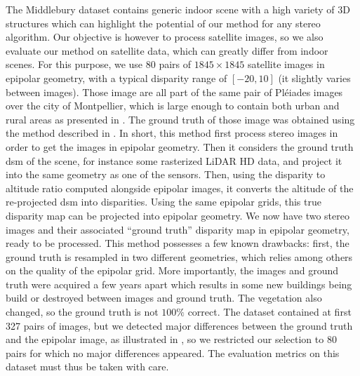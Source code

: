 The Middlebury dataset contains generic indoor scene with a high variety of 3D structures which can highlight the potential of our method for any stereo algorithm. Our objective is however to process satellite images, so we also evaluate our method on satellite data, which can greatly differ from indoor scenes. For this purpose, we use 80 pairs of $1845\times1845$ satellite images in epipolar geometry, with a typical disparity range of $[-20, 10]$ (it slightly varies between images). Those image are all part of the same pair of Pléiades images over the city of Montpellier, which is large enough to contain both urban and rural areas as presented in . The ground truth of those image was obtained using the method described in \cite{cournet_ground_2020}. In short, this method first process stereo images in order to get the images in epipolar geometry. Then it considers the ground truth \acrshort{dsm} of the scene, for instance some rasterized LiDAR HD data, and project it into the same geometry as one of the sensors. Then, using the disparity to altitude ratio computed alongside epipolar images, it converts the altitude of the re-projected \acrshort{dsm} into disparities. Using the same epipolar grids, this true disparity map can be projected into epipolar geometry. We now have two stereo images and their associated ``ground truth'' disparity map in epipolar geometry, ready to be processed. This method possesses a few known drawbacks: first, the ground truth is resampled in two different geometries, which relies among others on the quality of the epipolar grid. More importantly, the images and ground truth were acquired a few years apart which results in some new buildings being build or destroyed between images and ground truth. The vegetation also changed, so the ground truth is not $100\%$ correct. The dataset contained at first 327 pairs of images, but we detected major differences between the ground truth and the epipolar image, as illustrated in , so we restricted our selection to 80 pairs for which no major differences appeared. The evaluation metrics on this dataset must thus be taken with care.

